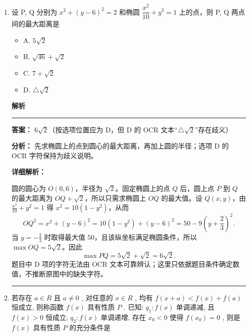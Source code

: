 \documentclass[UTF8,12pt,a4paper]{ctexart}
\newenvironment{examSolutionBox}{%
  \par\medskip\begingroup
  \setlength{\leftskip}{1.0em}\setlength{\rightskip}{0.9em}%
  \noindent\textcolor{SolutionTeal}{\bfseries\large 解析}\par
  \smallskip\noindent\textcolor{SolutionRule}{\rule{\dimexpr\linewidth-\leftskip-\rightskip\relax}{0.8pt}}\par
  \smallskip\color{SolutionInk}%
}{%
  \par\smallskip\noindent\textcolor{SolutionRule}{\rule{\dimexpr\linewidth-\leftskip-\rightskip\relax}{0.8pt}}\par
  \endgroup\medskip
}
\providecommand{\tightlist}{%
  \setlength{\itemsep}{0pt}\setlength{\parskip}{0pt}}
\begin{document}
\begin{enumerate}
\begin{examSolutionBox}
  \textbf{详细解析：}

  设长方体从同一顶点出发的三条棱长分别为 \(a,b,c\)，体对角线长为 \(d=\sqrt{a^2+b^2+c^2}\)。直线与三个相邻面的夹角的正弦分别等于体对角线在三个对应法向方向上的分量与 \(d\) 的比，因此可记为 \(\frac a d,\frac b d,\frac c d\)（次序不影响结论）。于是
  \[
  \sin^2\alpha+\sin^2\beta+\sin^2\gamma
  =\frac{a^2+b^2+c^2}{d^2}=1.
  \]

  \end{examSolutionBox}
\item
  设 P, Q 分别为 \(x^{2} + (y - 6)^{2} = 2\) 和椭圆 \(\dfrac{x^{2}}{10} + y^{2} = 1\) 上的点，则 P, Q 两点间的最大距离是

  \begin{itemize}
  \tightlist
  \item
    A. \(5\sqrt{2}\)
  \item
    B. \(\sqrt{46} + \sqrt{2}\)
  \item
    C. \(7 + \sqrt{2}\)
  \item
    D. \(\triangle\sqrt{2}\)
  \end{itemize}

  \begin{examSolutionBox}

  \textbf{答案：} \(6\sqrt2\)（按选项位置应为 D，但 D 的 OCR 文本``\(\triangle\sqrt2\)''存在歧义）

  \textbf{分析：} 先求椭圆上的点到圆心的最大距离，再加上圆的半径；选项 D 的 OCR 字符保持为歧义说明。

  \textbf{详细解析：}

  圆的圆心为 \(O(0,6)\)，半径为 \(\sqrt2\)。固定椭圆上的点 \(Q\) 后，圆上点 \(P\) 到 \(Q\) 的最大距离为 \(OQ+\sqrt2\)，所以只需求椭圆上 \(OQ\) 的最大值。设 \(Q(x,y)\)，由 \(\frac{x^2}{10}+y^2=1\) 得 \(x^2=10(1-y^2)\)，从而
  \[
  OQ^2=x^2+(y-6)^2
  =10(1-y^2)+(y-6)^2
  =50-9\left(y+\frac23\right)^2.
  \]
  当 \(y=-\frac23\) 时取得最大值 \(50\)，且该纵坐标满足椭圆条件，所以 \(\max OQ=5\sqrt2\)。因此
  \[
  \max PQ=5\sqrt2+\sqrt2=6\sqrt2.
  \]
  题目中 D 项的字符无法由 OCR 文本可靠辨认；这里只依据题目条件确定数值，不推断原图中的缺失字符。

  \end{examSolutionBox}
\item
  若存在 \(a \in R\) 且 \(a \neq 0\) , 对任意的 \(x \in R\) , 均有 \(f(x + a) < f(x) + f(a)\) 恒成立, 则称函数 \(f(x)\) 具有性质 \(P\) . 已知: \(q_{1}: f(x)\) 单调递减, 且 \(f(x) > 0\) 恒成立; \(q_{2}: f(x)\) 单调递增, 存在 \(x_{0} < 0\) 使得 \(f(x_{0}) = 0\) , 则是 \(f(x)\) 具有性质 \(P\) 的充分条件是


\end{enumerate}
\end{document}
